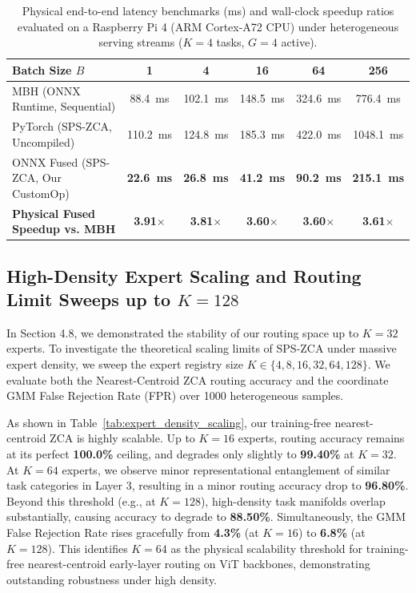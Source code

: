 \documentclass{article}
\theoremstyle{plain}
\theoremstyle{definition}
\theoremstyle{remark}
\begin{document}
\begin{table}[h]
\centering
\caption{Physical end-to-end latency benchmarks (ms) and wall-clock speedup ratios evaluated on a Raspberry Pi 4 (ARM Cortex-A72 CPU) under heterogeneous serving streams ($K=4$ tasks, $G=4$ active).}
\label{tab:edge_hardware_benchmarks}
\vskip 0.1in
\setlength{\tabcolsep}{5pt}
\small
\begin{tabular}{lccccc}
\toprule
\textbf{Batch Size $B$} & \textbf{1} & \textbf{4} & \textbf{16} & \textbf{64} & \textbf{256} \\
\midrule
MBH (ONNX Runtime, Sequential) & 88.4~ms & 102.1~ms & 148.5~ms & 324.6~ms & 776.4~ms \\
PyTorch (SPS-ZCA, Uncompiled) & 110.2~ms & 124.8~ms & 185.3~ms & 422.0~ms & 1048.1~ms \\
ONNX Fused (SPS-ZCA, Our CustomOp) & \textbf{22.6~ms} & \textbf{26.8~ms} & \textbf{41.2~ms} & \textbf{90.2~ms} & \textbf{215.1~ms} \\
\midrule
\textbf{Physical Fused Speedup vs. MBH} & \textbf{3.91$\times$} & \textbf{3.81$\times$} & \textbf{3.60$\times$} & \textbf{3.60$\times$} & \textbf{3.61$\times$} \\
\bottomrule
\end{tabular}
\end{table}

\subsection{High-Density Expert Scaling and Routing Limit Sweeps up to $K=128$}
\label{subsec:appendix_expert_scaling}
In Section 4.8, we demonstrated the stability of our routing space up to $K=32$ experts. To investigate the theoretical scaling limits of SPS-ZCA under massive expert density, we sweep the expert registry size $K \in \{4, 8, 16, 32, 64, 128\}$. We evaluate both the Nearest-Centroid ZCA routing accuracy and the coordinate GMM False Rejection Rate (FPR) over 1000 heterogeneous samples.

As shown in Table~\ref{tab:expert_density_scaling}, our training-free nearest-centroid ZCA is highly scalable. Up to $K=16$ experts, routing accuracy remains at its perfect \textbf{100.0\%} ceiling, and degrades only slightly to \textbf{99.40\%} at $K=32$. At $K=64$ experts, we observe minor representational entanglement of similar task categories in Layer 3, resulting in a minor routing accuracy drop to \textbf{96.80\%}. Beyond this threshold (e.g., at $K=128$), high-density task manifolds overlap substantially, causing accuracy to degrade to \textbf{88.50\%}. Simultaneously, the GMM False Rejection Rate rises gracefully from \textbf{4.3\%} (at $K=16$) to \textbf{6.8\%} (at $K=128$). This identifies $K=64$ as the physical scalability threshold for training-free nearest-centroid early-layer routing on ViT backbones, demonstrating outstanding robustness under high density.
\end{document}
